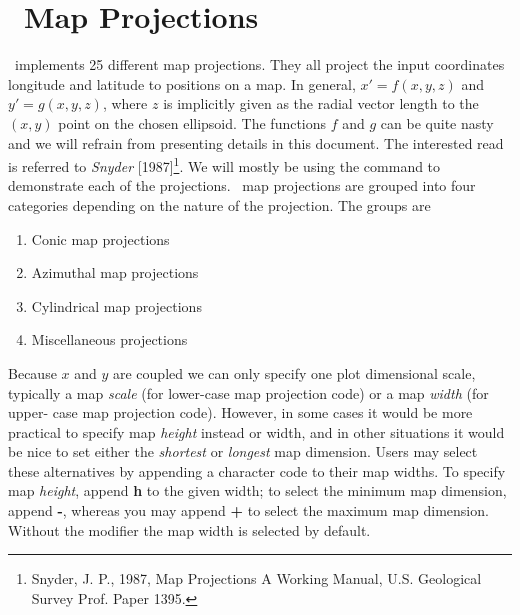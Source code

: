 %
%
\chapter{\gmt\ Map Projections}

\GMT\ implements 25 different map projections.  They all project the input coordinates
longitude and latitude to positions on a map.  In general, $x' = f(x,y,z)$ and $y' = g(x,y,z)$, where
$z$ is implicitly given as the radial vector length to the $(x,y)$ point on the chosen ellipsoid.  The functions $f$ and $g$ can be
quite nasty and we will refrain from presenting details in this document.  The interested read is referred to
{\it Snyder} [1987]\footnote{Snyder, J. P., 1987, Map Projections \- A Working Manual, U.S. Geological Survey Prof. Paper 1395.}.
We will mostly be using the  command to demonstrate each of the projections.
\GMT\ map projections are grouped into four categories depending on the
nature of the projection.  The groups are

\begin{enumerate}
\item Conic map projections
\item Azimuthal map projections
\item Cylindrical map projections
\item Miscellaneous projections
\end{enumerate}

Because $x$ and $y$ are coupled we can only specify one plot dimensional scale, typically
a map \emph{scale} (for lower-case map projection code) or a map \emph{width} (for upper-
case map projection code).  However, in some cases it would be more
practical to specify map \emph{height} instead or width, and in other situations it would be nice
to set either the \emph{shortest} or \emph{longest} map dimension.  Users may select
these alternatives by appending a character code to their map widths.  To specify map \emph{height},
append {\bf h} to the given width; to select the minimum map dimension, append {\bf -}, whereas you may
append {\bf +} to select the maximum map dimension.  Without the modifier the map width is
selected by default.





